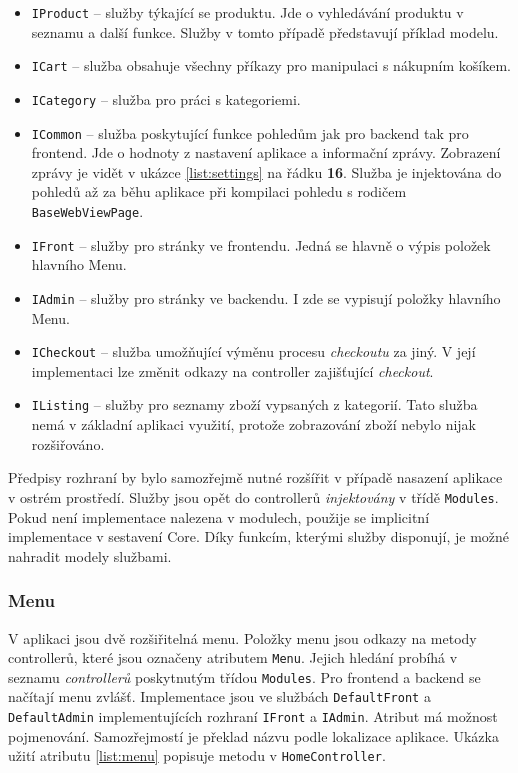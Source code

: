 \documentclass[11pt,twoside,a4paper]{book}
\begin{document}
\begin{itemize}
\item \texttt{IProduct} -- služby týkající se produktu. Jde o vyhledávání produktu v seznamu a další funkce. Služby v tomto případě představují příklad modelu.
\item \texttt{ICart} -- služba obsahuje všechny příkazy pro manipulaci s nákupním košíkem.
\item \texttt{ICategory} -- služba pro práci s kategoriemi.
\item \texttt{ICommon} -- služba poskytující funkce pohledům jak pro backend tak pro frontend. Jde o hodnoty z nastavení aplikace a informační zprávy. Zobrazení zprávy je vidět v ukázce \ref{list:settings} na řádku \textbf{16}. Služba je injektována do pohledů až za běhu aplikace při kompilaci pohledu s rodičem \texttt{BaseWebViewPage}.
\item \texttt{IFront} -- služby pro stránky ve frontendu. Jedná se hlavně o výpis položek hlavního Menu.
\item \texttt{IAdmin} -- služby pro stránky ve backendu. I zde se vypisují položky hlavního Menu.
\item \texttt{ICheckout} -- služba umožňující výměnu procesu \textit{checkoutu} za jiný. V její implementaci lze změnit odkazy na controller zajišťující \textit{checkout}.
\item \texttt{IListing} -- služby pro seznamy zboží vypsaných z kategorií. Tato služba nemá v základní aplikaci využití, protože zobrazování zboží nebylo nijak rozšiřováno.
\end{itemize}
 
Předpisy rozhraní by bylo samozřejmě nutné rozšířit v případě nasazení aplikace v ostrém prostředí. Služby jsou opět do controllerů \textit{injektovány} v třídě \texttt{Modules}. Pokud není implementace nalezena v modulech, použije se implicitní implementace v sestavení \textsf{Core}. Díky funkcím, kterými služby disponují, je možné nahradit modely službami.
 
\subsubsection{Menu}
\label{sec:menu}

V aplikaci jsou dvě rozšiřitelná menu. Položky menu jsou odkazy na metody controllerů, které jsou označeny atributem \texttt{Menu}. Jejich hledání probíhá v seznamu \textit{controllerů} poskytnutým třídou \texttt{Modules}. Pro frontend a backend se načítají menu zvlášť. Implementace jsou ve službách \texttt{DefaultFront} a \texttt{DefaultAdmin} implementujících rozhraní \texttt{IFront} a \texttt{IAdmin}. Atribut má možnost pojmenování. Samozřejmostí je překlad názvu podle lokalizace aplikace. Ukázka užití atributu \ref{list:menu} popisuje metodu v \texttt{HomeController}. 
\end{document}
